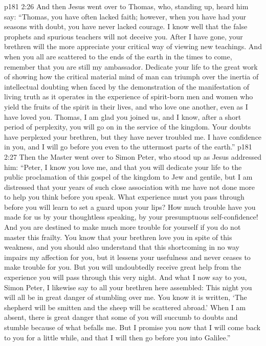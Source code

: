 \pc \vs p181 2:26 And then Jesus went over to Thomas, who, standing up, heard him say: \textcolor{ubdarkred}{“Thomas, you have often lacked faith; however, when you have had your seasons with doubt, you have never lacked courage. I know well that the false prophets and spurious teachers will not deceive you. After I have gone, your brethren will the more appreciate your critical way of viewing new teachings. And when you all are scattered to the ends of the earth in the times to come, remember that you are still my ambassador. Dedicate your life to the great work of showing how the critical material mind of man can triumph over the inertia of intellectual doubting when faced by the demonstration of the manifestation of living truth as it operates in the experience of spirit\hyp{}born men and women who yield the fruits of the spirit in their lives, and who love one another, even as I have loved you. Thomas, I am glad you joined us, and I know, after a short period of perplexity, you will go on in the service of the kingdom. Your doubts have perplexed your brethren, but they have never troubled me. I have confidence in you, and I will go before you even to the uttermost parts of the earth.”}
\pc \vs p181 2:27 Then the Master went over to Simon Peter, who stood up as Jesus addressed him: \textcolor{ubdarkred}{“Peter, I know you love me, and that you will dedicate your life to the public proclamation of this gospel of the kingdom to Jew and gentile, but I am distressed that your years of such close association with me have not done more to help you think before you speak. What experience must you pass through before you will learn to set a guard upon your lips? How much trouble have you made for us by your thoughtless speaking, by your presumptuous self\hyp{}confidence! And you are destined to make much more trouble for yourself if you do not master this frailty. You know that your brethren love you in spite of this weakness, and you should also understand that this shortcoming in no way impairs my affection for you, but it lessens your usefulness and never ceases to make trouble for you. But you will undoubtedly receive great help from the experience you will pass through this very night. And what I now say to you, Simon Peter, I likewise say to all your brethren here assembled: This night you will all be in great danger of stumbling over me. You know it is written, ‘The shepherd will be smitten and the sheep will be scattered abroad.’ When I am absent, there is great danger that some of you will succumb to doubts and stumble because of what befalls me. But I promise you now that I will come back to you for a little while, and that I will then go before you into Galilee.”}\plusone
